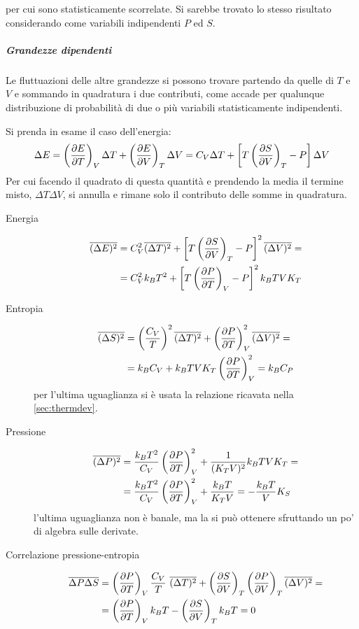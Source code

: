 \noindent per cui sono statisticamente scorrelate. Si sarebbe trovato lo stesso risultato considerando come variabili indipendenti $P$ ed $S$.

\subparagraph{Grandezze dipendenti} Le fluttuazioni delle altre grandezze si possono trovare partendo da quelle di $T$ e $V$ e sommando in quadratura i due contributi, come accade per qualunque distribuzione di probabilità di due o più variabili statisticamente indipendenti.

\begin{es}
	Si prenda in esame il caso dell'energia:
	\begin{equation*}
	\Delta E = \left(\frac{\partial {E}}{\partial {T}}\right)_{V} \Delta T + \left(\frac{\partial {E}}{\partial {V}}\right)_{T} \Delta V = C_V \Delta T + \left[ T \left(\frac{\partial {S}}{\partial {V}}\right)_{T} - P\right] \Delta V
	\end{equation*}
	Per cui facendo il quadrato di questa quantità e prendendo la media il termine misto, $\Delta T \Delta V$, si annulla e rimane solo il contributo delle somme in quadratura.
\end{es}

\begin{description}
	\item[Energia] 
	\begin{align*}
	\overline{(\Delta E)^2} &= C_V^2 \overline{(\Delta T)^2} + \left[T\left(\frac{\partial {S}}{\partial {V}}\right)_{T} - P\right]^2 \overline{(\Delta V)^2} =\\
	&= C_V^2 k_B T^2 + \left[T\left(\frac{\partial {P}}{\partial {T}}\right)_{V} - P\right]^2 k_B T V K_T
	\end{align*}
	\item[Entropia]
	\begin{align*}
	\overline{(\Delta S)^2} &= \left(\frac{C_V}{T}\right)^2 \overline{(\Delta T)^2} + \left(\frac{\partial {P}}{\partial {T}}\right)_{V}^2 \overline{(\Delta V)^2} =\\
	&= k_B C_V + k_B T V K_T \left(\frac{\partial {P}}{\partial {T}}\right)_{V}^2 = k_B C_P
	\end{align*}
	per l'ultima uguaglianza si è usata la relazione ricavata nella \cref{sec:thermdev}.
	\item[Pressione]
	\begin{align*}
	\overline{(\Delta P)^2} &= \frac{k_B T^2}{C_V} \left(\frac{\partial {P}}{\partial {T}}\right)_{V}^2 + \frac{1}{(K_T V)^2} k_B T V K_T=\\
	&= \frac{k_B T^2}{C_V} \left(\frac{\partial {P}}{\partial {T}}\right)_{V}^2 + \frac{k_B T}{K_T V} = - \frac{k_B T}{V} K_S
	\end{align*}
	l'ultima uguaglianza non è banale, ma la si può ottenere sfruttando un po' di algebra sulle derivate.
	\item[Correlazione pressione-entropia]
	\begin{align*}
	\overline{\Delta P \Delta S} &= \left(\frac{\partial {P}}{\partial {T}}\right)_{V} \frac{C_V}{T}~\overline{(\Delta T)^2} + \left(\frac{\partial {S}}{\partial {V}}\right)_{T} \left(\frac{\partial {P}}{\partial {V}}\right)_{T} \overline{(\Delta V)^2} =\\
	&= \left(\frac{\partial {P}}{\partial {T}}\right)_{V} k_B T - \left(\frac{\partial {S}}{\partial {V}}\right)_{T} k_B T = 0
	\end{align*}
\end{description}

